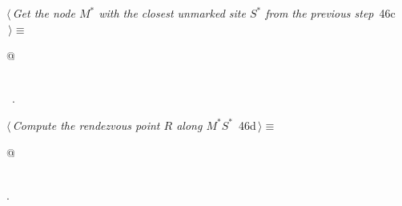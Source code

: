 \documentclass[11.5pt]{report}
\begin{document}
\begin{flushleft} \small
\begin{minipage}{\linewidth}\label{scrap56}\raggedright\small
{} $\langle\,${\itshape Get the node $M^{*}$ with the closest unmarked site $S^{*}$ from the previous step}\nobreak\ {\footnotesize {46c}}$\,\rangle\equiv$
\vspace{-1ex}
\begin{list}{}{} \item
\mbox{}\verb@   @\\
\mbox{}\verb@pass@\\
\mbox{}\verb@@{\NWsep}
\end{list}
\vspace{-1.5ex}
\footnotesize
\begin{list}{}{\setlength{\itemsep}{-\parsep}\setlength{\itemindent}{-\leftmargin}}
\item \NWtxtMacroRefIn\ .

\item{}
\end{list}
\end{minipage}\vspace{4ex}
\end{flushleft}
\vspace{-0.8cm} \newchunk
\begin{flushleft} \small
\begin{minipage}{\linewidth}\label{scrap57}\raggedright\small
{} $\langle\,${\itshape Compute the rendezvous point $R$ along $M^{*}S^{*}$}\nobreak\ {\footnotesize {46d}}$\,\rangle\equiv$
\vspace{-1ex}
\begin{list}{}{} \item
\mbox{}\verb@   @\\
\mbox{}\verb@pass@\\
\mbox{}\verb@@{\NWsep}
\end{list}
\vspace{-1.5ex}
\footnotesize
\begin{list}{}{\setlength{\itemsep}{-\parsep}\setlength{\itemindent}{-\leftmargin}}
\item {\NWtxtMacroNoRef}.

\item{}
\end{list}
\end{minipage}\vspace{4ex}
\end{flushleft}
\vspace{-0.8cm}\newchunk
\end{document}
